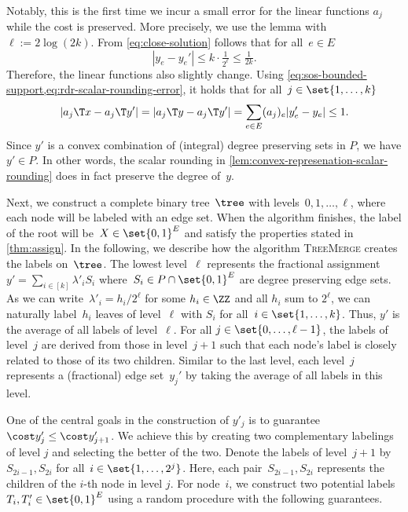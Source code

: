 \documentclass[a4paper,USenglish,cleveref,thm-restate]{lipics-v2021}
\begin{document}
Notably, this is the first time we incur a small error for the linear functions $a_j$ while the cost is preserved.
More precisely, we use the lemma with 
$\ell := 2\log(2k)$. From \cref{eq:close-solution} follows that for all~$e \in E$
\begin{equation}
    \label{eq:rdr-scalar-rounding-error}
    |y_e - y_e'| \le k \cdot \tfrac{1}{2^\ell} \le \tfrac{1}{2k}.
\end{equation} 
Therefore, the linear functions also slightly change.
Using \cref{eq:sos-bounded-support,eq:rdr-scalar-rounding-error}, it holds that for all~$j\in \set{1,\dotsc,k}$
\begin{equation}
    \label{eq:rdr-increase-in-linear-function}
    |a_j\T x - a_j\T y'| = |a_j\T y - a_j\T y'| = \sum_{e \in E} (a_j)_e | y_e' - y_e | \le 1.
\end{equation} 
Since $y'$ is a convex combination of (integral)
degree preserving sets in $P$, we have $y'\in P$. In other words, the scalar rounding in \cref{lem:convex-represenation-scalar-rounding} does in fact preserve the degree of~$y$. 

Next, we construct a complete binary tree~$\tree$ with levels~$0,1,\dotsc,\ell$, where each node will be labeled with an edge set.
When the algorithm finishes, the label of the root will be~$X \in \set{0,1}^E$ and satisfy the properties stated in \cref{thm:assign}.
In the following, we describe how the algorithm \textsc{TreeMerge} creates the labels on~$\tree$.
The lowest level~$\ell$ represents the fractional assignment~$y' = \sum_{i \in [k]} \lambda'_i S_i$ where~$S_i \in P\cap \set{0,1}^E$ are degree preserving edge sets.
As we can write~$\lambda'_i = h_i/2^{\ell}$ 
for some $h_i\in\ZZ$ and all $h_i$ sum to $2^{\ell}$, we can naturally label~$h_i$ leaves of level~$\ell$ with $S_i$ for all~$i \in \set{1, \dotsc, k}$.
Thus, $y'$ is the average of all labels of level~$\ell$.
For all $j \in \set{0, \dotsc, \ell-1}$, the labels of level~$j$ are derived from those in level~$j + 1$ such that each node's label is closely related to
those of its two children.
Similar to the last level, each level~$j$ represents a (fractional) edge set~$y_j'$ by taking the average of all labels in this level.

One of the central goals in the construction of $y'_j$ is to guarantee~$\cost y_{j}' \le \cost y_{j+1}'$.
We achieve this by creating two complementary
labelings of level $j$ and selecting the better
of the two.
Denote the labels of level~$j+1$ by~$S_{2i-1}, S_{2i}$ for all~$i\in\set{1, \dotsc, 2^{j}}$. 
Here, each pair~$S_{2i-1}, S_{2i}$ represents the children of the $i$-th node in level $j$. For node~$i$, we construct two potential labels~$T_{i}, T_{i}' \in \set{0,1}^E$ using a random procedure with the following guarantees.
\end{document}

